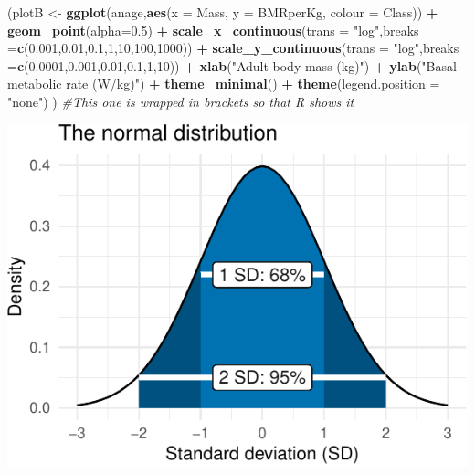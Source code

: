 \documentclass[
  a4paperpaper,
]{book}
\newenvironment{Shaded}{\begin{snugshade}}{\end{snugshade}}
\newcommand{\CommentTok}[1]{\textcolor[rgb]{0.56,0.35,0.01}{\textit{#1}}}
\newcommand{\DataTypeTok}[1]{\textcolor[rgb]{0.13,0.29,0.53}{#1}}
\newcommand{\DecValTok}[1]{\textcolor[rgb]{0.00,0.00,0.81}{#1}}
\newcommand{\FloatTok}[1]{\textcolor[rgb]{0.00,0.00,0.81}{#1}}
\newcommand{\KeywordTok}[1]{\textcolor[rgb]{0.13,0.29,0.53}{\textbf{#1}}}
\newcommand{\NormalTok}[1]{#1}
\newcommand{\OperatorTok}[1]{\textcolor[rgb]{0.81,0.36,0.00}{\textbf{#1}}}
\newcommand{\StringTok}[1]{\textcolor[rgb]{0.31,0.60,0.02}{#1}}
\begin{document}
\begin{Shaded}
\begin{Highlighting}[]
\NormalTok{(plotB \textless{}{-}}\StringTok{ }\KeywordTok{ggplot}\NormalTok{(anage,}\KeywordTok{aes}\NormalTok{(}\DataTypeTok{x =}\NormalTok{ Mass, }\DataTypeTok{y =}\NormalTok{ BMRperKg, }\DataTypeTok{colour =}\NormalTok{ Class)) }\OperatorTok{+}
\StringTok{    }\KeywordTok{geom\_point}\NormalTok{(}\DataTypeTok{alpha=}\FloatTok{0.5}\NormalTok{) }\OperatorTok{+}\StringTok{ }
\StringTok{    }\KeywordTok{scale\_x\_continuous}\NormalTok{(}\DataTypeTok{trans =} \StringTok{"log"}\NormalTok{,}\DataTypeTok{breaks =}\KeywordTok{c}\NormalTok{(}\FloatTok{0.001}\NormalTok{,}\FloatTok{0.01}\NormalTok{,}\FloatTok{0.1}\NormalTok{,}\DecValTok{1}\NormalTok{,}\DecValTok{10}\NormalTok{,}\DecValTok{100}\NormalTok{,}\DecValTok{1000}\NormalTok{)) }\OperatorTok{+}
\StringTok{    }\KeywordTok{scale\_y\_continuous}\NormalTok{(}\DataTypeTok{trans =} \StringTok{"log"}\NormalTok{,}\DataTypeTok{breaks =}\KeywordTok{c}\NormalTok{(}\FloatTok{0.0001}\NormalTok{,}\FloatTok{0.001}\NormalTok{,}\FloatTok{0.01}\NormalTok{,}\FloatTok{0.1}\NormalTok{,}\DecValTok{1}\NormalTok{,}\DecValTok{10}\NormalTok{)) }\OperatorTok{+}\StringTok{ }
\StringTok{    }\KeywordTok{xlab}\NormalTok{(}\StringTok{"Adult body mass (kg)"}\NormalTok{) }\OperatorTok{+}\StringTok{ }
\StringTok{    }\KeywordTok{ylab}\NormalTok{(}\StringTok{"Basal metabolic rate (W/kg)"}\NormalTok{) }\OperatorTok{+}
\StringTok{    }\KeywordTok{theme\_minimal}\NormalTok{() }\OperatorTok{+}\StringTok{ }
\StringTok{    }\KeywordTok{theme}\NormalTok{(}\DataTypeTok{legend.position  =} \StringTok{"none"}\NormalTok{)}
\NormalTok{) }\CommentTok{\#This one is wrapped in brackets so that R shows it}
\end{Highlighting}
\end{Shaded}

\includegraphics{BB852_files/figure-latex/unnamed-chunk-129-1.pdf}
\end{document}
